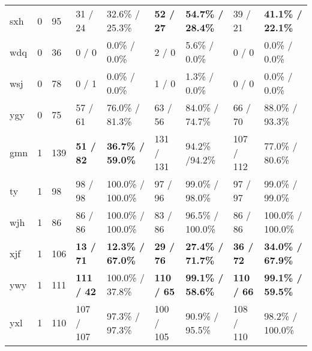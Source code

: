 \begin{center}
\begin{longtable}{m{1cm}<{\centering}m{1cm}<{\centering}m{1cm}<{\centering}m{1.5cm}<{\centering}m{2cm}<{\centering}m{1.5cm}<{\centering}m{2cm}<{\centering}m{1.5cm}<{\centering}m{2cm}<{\centering}}
             sxh       & 0           & 95                    & 31 / 24         & 32.6\% / 25.3\%     & \textbf{52 / 27}         & \textbf{54.7\% / 28.4\%}     & 39 / 21         & \textbf{41.1\% / 22.1\%}                                                               \\
             wdq       & 0           & 36                    & 0 / 0          & 0.0\% / 0.0\%      & 2 / 0          & 5.6\% / 0.0\%      & 0 / 0          & 0.0\% / 0.0\%                                              \\
             wsj       & 0           & 78                    & 0 / 1          & 0.0\% / 0.0\%      & 1 / 0          & 1.3\% / 0.0\%     & 0 / 0          & 0.0\% / 0.0\%                                              \\
             ygy       & 0           & 75                    & 57 / 61         & 76.0\% / 81.3\%     & 63 / 56         & 84.0\% / 74.7\%    & 66 / 70         & 88.0\% / 93.3\%                                                      \\
             gmn       & 1           & 139                   & \textbf{51 / 82}        & \textbf{36.7\% / 59.0\%}     & 131 / 131        & 94.2\% /94.2\%    & 107 / 112        & 77.0\% / 80.6\%                                  \\
             ty        & 1           & 98                    & 98 / 98         & 100.0\% / 100.0\%     & 97 / 96         & 99.0\% / 98.0\%     & 97 / 97         & 99.0\% / 99.0\%                                                        \\
             wjh       & 1           & 86                    & 86 / 86         & 100.0\% / 100.0\%    & 83 / 86         & 96.5\% / 100.0\%    & 86 / 86         & 100.0\% / 100.0\%                            \\
             xjf       & 1           & 106                   & \textbf{13 / 71}         & \textbf{12.3\% / 67.0\%}     & \textbf{29 / 76}         & \textbf{27.4\% / 71.7\%}    & \textbf{36 / 72}         & \textbf{34.0\% / 67.9\%}                    \\
             ywy       & 1           & 111                   & \textbf{111 / 42}        & 100.0\% / 37.8\%     & \textbf{110 / 65}        & \textbf{99.1\% / 58.6\%}    & \textbf{110 / 66}        & \textbf{99.1\% / 59.5\%}                                 \\
             yxl       & 1           & 110                   & 107 / 107        & 97.3\% / 97.3\%   & 100 / 105        & 90.9\% / 95.5\%    & 108 / 110        & 98.2\% / 100.0\%                                      \\

\end{longtable}
\end{center}
